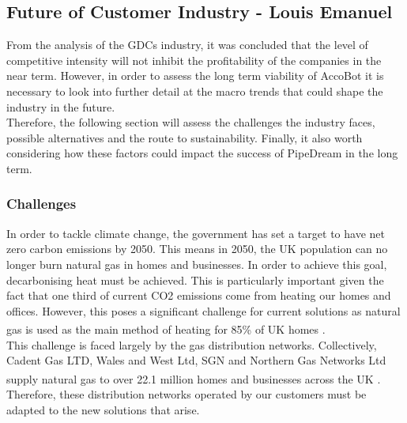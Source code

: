 \documentclass[11pt]{article}		%
\newcommand{\supercite}[1]{\textsuperscript{\cite{#1}}}		%
\newcommand{\sectref}[1]{\hyperref[#1]{Section \ref*{#1}}}     %
\begin{document}
                
        
        \subsection[Future of Customer Industry]{Future of Customer Industry - Louis Emanuel} \label{customerFuture}
            
    		From the analysis of the GDCs industry, it was concluded that the level of competitive intensity will not inhibit the profitability of the companies in the near term. However, in order to assess the long term viability of AccoBot it is necessary to look into further detail at the macro trends that could shape the industry in the future.
    		\\
    	    \hspace*{3ex}Therefore, the following section will assess the challenges the industry faces, possible alternatives and the route to sustainability. Finally, it also worth considering how these factors could impact the success of PipeDream in the long term. 
    	    
    	    \subsubsection[Challenges]{Challenges}
    	    
            In order to tackle climate change, the government has set a target to have net zero carbon emissions by 2050. This means in 2050, the UK population can no longer burn natural gas in homes and businesses. In order to achieve this goal, decarbonising heat must be achieved. This is particularly important given the fact that one third of current CO2 emissions come from heating our homes and offices. However, this poses a significant challenge for current solutions as natural gas is used as the main method of heating for 85\% of UK homes \supercite{85gas}.
            \\
            \hspace*{3ex}This challenge is faced largely by the gas distribution networks. Collectively, Cadent Gas LTD, Wales and West Ltd, SGN and Northern Gas Networks Ltd supply natural gas to over 22.1 million homes and businesses across the UK \supercite{supplied}. Therefore, these distribution networks operated by our customers must be adapted to the new solutions that arise. 
    
\end{document}
